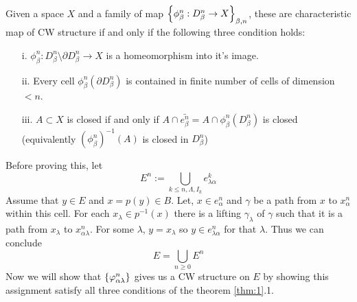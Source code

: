 \documentclass[11pt]{article}
\newcommand{\p}{\partial}
\begin{document}
\begin{Thm}{ }{ }\label{thm:1}
   Given a space $X$ and a family of map $\qty{\phi_{\beta}^n : D^n_{\beta}\to X}_{\beta,n}$, these are characteristic map of CW structure if and only if the following three condition holds: 
   \begin{itemize}
      \item[i.]  $\phi_{\beta}^n : D^n_{\beta} \setminus \p D^n_{\beta}\to X$ is a homeomorphism into it's image.
      \item[ii.] Every cell $\phi_{\beta}^n(\p D^n_{\beta})$ is contained in finite number of cells of dimension $<n$.
      \item[iii.] $A \subset X$ is closed if and only if $A \cap \bar{e^n_{\beta}} = A \cap \phi_{\beta}^n(D_{\beta}^n)$ is closed (equivalently $(\phi_{\beta}^n)^{-1}(A)$ is closed in $D^n_{\beta}$)  
   \end{itemize}
\end{Thm}

\noindent Before proving this, let $$E^n := \bigcup_{k \leq n, \Lambda,I_k} {e^k_{\lambda \alpha}}$$ Assume that $y \in E$ and $x =p(y)\in B$. Let, $x \in e^n_{\alpha}$ and $\gamma$ be a path from $x$ to $x^n_{\alpha}$ within this cell. For each $x_\lambda \in p^{-1}(x)$ there is a lifting $\gamma_{\lambda}$ of $\gamma$ such that it is a path from $x_{\lambda}$ to $x^{n}_{\alpha \lambda}$. For some $\lambda$, $y = x_{\lambda}$ so $y \in e^n_{\lambda\alpha}$ for that $\lambda$. Thus we can conclude $$E = \bigcup_{n\geq 0}E^n$$
Now we will show that $\qty{\varphi_{\alpha \lambda}^n}$ gives us a CW structure on $E$ by showing this assignment  satisfy all three conditions of the theorem \ref{thm:1}.1. 
\end{document}
